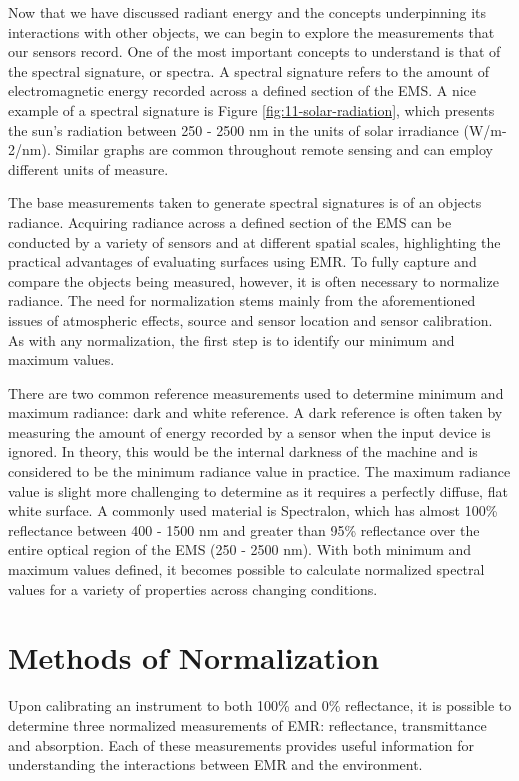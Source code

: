 \documentclass[
]{book}
\begin{document}
Now that we have discussed radiant energy and the concepts
underpinning its interactions with other objects, we can begin to
explore the measurements that our sensors record. One of the most
important concepts to understand is that of the spectral signature, or
spectra. A spectral signature refers to the amount of electromagnetic
energy recorded across a defined section of the EMS. A nice example
of a spectral signature is Figure \ref{fig:11-solar-radiation}, which
presents the sun's radiation between 250 - 2500 nm in the units of
solar irradiance (W/m-2/nm). Similar graphs are common throughout remote
sensing and can employ different units of measure.

The base measurements taken to generate spectral signatures is of an
objects radiance. Acquiring radiance across a defined section of the EMS
can be conducted by a variety of sensors and at different spatial
scales, highlighting the practical advantages of evaluating surfaces
using EMR. To fully capture and compare the objects being measured,
however, it is often necessary to normalize radiance. The need for
normalization stems mainly from the aforementioned issues of atmospheric
effects, source and sensor location and sensor calibration. As with any
normalization, the first step is to identify our minimum and maximum
values.

There are two common reference measurements used to determine minimum
and maximum radiance: dark and white reference. A dark reference is
often taken by measuring the amount of energy recorded by a sensor
when the input device is ignored. In theory, this would be the internal
darkness of the machine and is considered to be the minimum radiance
value in practice. The maximum radiance value is slight more challenging
to determine as it requires a perfectly diffuse, flat white surface. A
commonly used material is Spectralon, which has almost 100\% reflectance
between 400 - 1500 nm and greater than 95\% reflectance over the entire
optical region of the EMS (250 - 2500 nm). With both minimum and maximum
values defined, it becomes possible to calculate normalized spectral
values for a variety of properties across changing conditions.

\hypertarget{methods-of-normalization}{%
\section{Methods of Normalization}\label{methods-of-normalization}}

Upon calibrating an instrument to both 100\% and 0\% reflectance, it is
possible to determine three normalized measurements of EMR: reflectance,
transmittance and absorption. Each of these measurements provides useful
information for understanding the interactions between EMR and the
environment.
\end{document}
